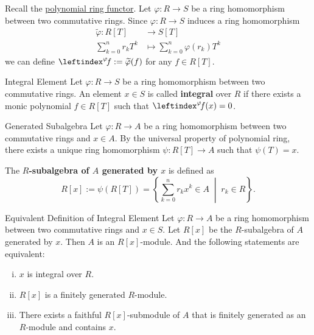 Recall the \hyperref[th:free_commutative_algebra]{polynomial ring functor}. Let $\varphi:R\to S$ be a ring homomorphism between two commutative rings. Since $\varphi:R\to S$ induces a ring homomorphism 
\begin{align*}
    \widetilde{\varphi}:R[T]& \longrightarrow S[T]\\
    \sum_{k=0}^n r_k T^k &\longmapsto \sum_{k=0}^n \varphi(r_k) T^k
\end{align*}
we can define $\leftindex^{\varphi}\!f:=\widetilde{\varphi}(f)$ for any $f\in R[T]$.

\begin{definition}{Integral Element}
    Let $\varphi:R\to S$ be a ring homomorphism between two commutative rings. An element $x\in S$ is called \textbf{integral} over $R$ if there exists a monic polynomial $f\in R[T]$ such that $\leftindex^{\varphi}\!f(x)=0$.
\end{definition}


\begin{definition}{Generated Subalgebra}{}
    Let $\varphi:R\to A$ be a ring homomorphism between two commutative rings and $x\in A$. By the universal property of polynomial ring, there exists a unique ring homomorphism $\psi:R[T]\to A$ such that 
    $\psi(T)=x$.
    \begin{center}
    \end{center}
    The \textbf{$R$-subalgebra of $A$ generated by $x$} is defined as 
    \[
    R[x]:=\psi\left(R[T]\right)=\left\{\sum_{k=0}^n r_k x^k \in A\;\middle|\; r_k\in R\right\}.
    \]
\end{definition}

\begin{proposition}{Equivalent Definition of Integral Element}{}
    Let $\varphi:R\to A$ be a ring homomorphism between two commutative rings and $x\in S$. Let $R[x]$ be the $R$-subalgebra of $A$ generated by $x$. Then $A$ is an $R[x]$-module. And the following statements are equivalent:
    \begin{enumerate}[(i)]
        \item $x$ is integral over $R$.
        \item $R[x]$ is a finitely generated $R$-module.
        \item There exists a faithful $R[x]$-submodule of $A$ that is finitely generated as an $R$-module and contains $x$.
    \end{enumerate}
    
\end{proposition}

